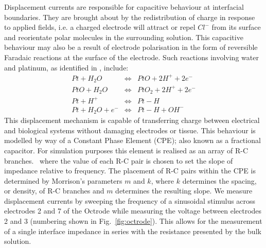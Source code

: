 \documentclass[journal, a4paper]{IEEEtran}
\begin{document}
Displacement currents are responsible for capacitive behaviour at interfacial boundaries.
They are brought about by the redistribution of charge in response to applied fields, i.e. a charged electrode will attract or repel $Cl^{-}$ from its surface and reorientate polar molecules in the surrounding solution.\cite{Merrill05} This capacitive behaviour may also be a result of electrode polarisation in the form of reversible Faradaic reactions at the surface of the electrode.
Such reactions involving water and platinum, as identified in \cite{Horch2004,Mohtashami2011,Merrill05}, include:
\begin{eqnarray}
    Pt + H_{2}O &\Leftrightarrow& PtO + 2 H^{+} + 2 e^{-}\\
    PtO + H_{2}O &\Leftrightarrow& PtO_{2} + 2 H^{+} + 2e^{-}\\
    Pt + H^{+} & \Leftrightarrow & Pt-H\\
    Pt + H_{2}O + e^{-} &\Leftrightarrow& Pt-H+OH^{-}
\end{eqnarray}
This displacement mechanism is capable of transferring charge between electrical and biological systems without damaging electrodes or tissue.\cite{Horch2004}
This behaviour is modelled by way of a Constant Phase Element (CPE); also known as a fractional capacitor.
For simulation purposes this element is realised as an array of R-C branches.~\cite{ScottSingle2013,Morrison59,Elwakil10} where the value of each R-C pair is chosen to set the slope of impedance relative to frequency. The placement of R-C pairs within the CPE is determined by Morrison's parameters $m$ and $k$, where $k$ determines the spacing, or density, of R-C branches and $m$ determines the resulting slope.
We measure displacement currents by sweeping the frequency of a sinusoidal stimulus across electrodes 2 and 7 of the Octrode while measuring the voltage between electrodes 2 and 3 (numbering shown in Fig.~\ref{fig:octrode}).
This allows for the measurement of a single interface impedance in series with the resistance presented by the bulk solution.
\end{document}
